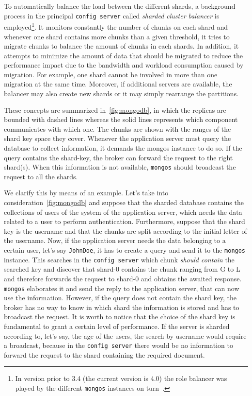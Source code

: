 To automatically balance the load between the different shards, a background
process in the principal \texttt{config server} called \emph{sharded cluster
balancer} is employed\footnote{In version prior to 3.4 (the current version is
4.0) the role balancer was played by the different \texttt{mongos} instances on
turn~\cite{bib:mongodb-docs}.}. It monitors constantly the number of chunks on
each shard and  whenever one  shard contains more chunks than a given threshold,
it tries to migrate chunks to balance the amount of chunks in each shards. In
addition, it attempts to minimize the amount of data that should be migrated to
reduce the performance impact due to the bandwidth and workload consumption
caused by migration. For example, one shard cannot be involved in more than one
migration at the same time. Moreover, if additional servers are available, the
balancer may also create new shards or it may simply rearrange the partitions.

These concepts are summarized in~\autoref{fig:mongodb}, in which the replicas
are bounded with dashed lines whereas the solid lines represents which component
communicates with which one. The chunks are shown with the ranges of the shard
key space they cover. Whenever the application server must query the database to
collect information, it demands the mongos instance to do so. If the query
contains the shard-key, the broker can forward the request to the right
shard(s). When this information is not available, \texttt{mongos} should
broadcast the request to all the shards.

We clarify this by means of an example. Let's take into
consideration~\autoref{fig:mongodb} and suppose that the sharded database
contains the collections of users of the system of the application server, which
needs the data related to a user to perform authentication. Furthermore, suppose
that the shard key is the username and that the chunks are split according to
the initial letter of the username. Now, if the application server needs the
data belonging to a certain user, let's say \texttt{JohnDoe}, it has to create a
query and send it to the \texttt{mongos} instance. This searches in the
\texttt{config server} which chunk \emph{should contain} the searched key and
discover that shard-0 contains the chunk ranging from G to L and therefore
forwards the request to shard-0 and obtains the awaited response.
\texttt{mongos} elaborates it and send the reply to the application server, that
can now use the information. However, if the query does not contain the shard
key, the broker has no way to know in which shard the information is stored and
has to broadcast the request. It is worth to notice that the choice of the shard
key is fundamental to grant a certain level of performance. If the server is
sharded according to, let's say, the age of the users, the search by username
would require a broadcast, because in the \texttt{config server} there would be
no information to forward the request to the shard containing the required
document.



